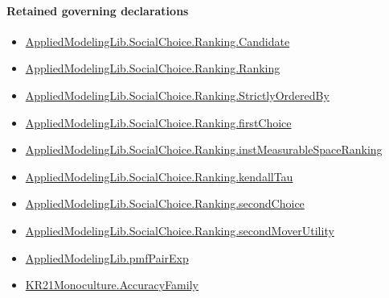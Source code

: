 \documentclass[10pt]{article}
\begin{document}
\paragraph{Retained governing declarations}
\begin{itemize}\raggedright
\item \hyperlink{library-prerequisite-8c0e6c25845ae78a}{Applied\allowbreak{}Modeling\allowbreak{}Lib.\allowbreak{}Social\allowbreak{}Choice.\allowbreak{}Ranking.\allowbreak{}Candidate}
\item \hyperlink{library-prerequisite-5cde54446d1ae021}{Applied\allowbreak{}Modeling\allowbreak{}Lib.\allowbreak{}Social\allowbreak{}Choice.\allowbreak{}Ranking.\allowbreak{}Ranking}
\item \hyperlink{library-prerequisite-3585717d1635654a}{Applied\allowbreak{}Modeling\allowbreak{}Lib.\allowbreak{}Social\allowbreak{}Choice.\allowbreak{}Ranking.\allowbreak{}Strictly\allowbreak{}Ordered\allowbreak{}By}
\item \hyperlink{governing-declaration-08e457479ee6cf15}{Applied\allowbreak{}Modeling\allowbreak{}Lib.\allowbreak{}Social\allowbreak{}Choice.\allowbreak{}Ranking.\allowbreak{}first\allowbreak{}Choice}
\item \hyperlink{governing-declaration-30ca9c740ef703ec}{Applied\allowbreak{}Modeling\allowbreak{}Lib.\allowbreak{}Social\allowbreak{}Choice.\allowbreak{}Ranking.\allowbreak{}inst\allowbreak{}Measurable\allowbreak{}Space\allowbreak{}Ranking}
\item \hyperlink{governing-declaration-127efd44d176e2ba}{Applied\allowbreak{}Modeling\allowbreak{}Lib.\allowbreak{}Social\allowbreak{}Choice.\allowbreak{}Ranking.\allowbreak{}kendall\allowbreak{}Tau}
\item \hyperlink{governing-declaration-25ac37baf58f31e2}{Applied\allowbreak{}Modeling\allowbreak{}Lib.\allowbreak{}Social\allowbreak{}Choice.\allowbreak{}Ranking.\allowbreak{}second\allowbreak{}Choice}
\item \hyperlink{library-prerequisite-21bd2a45ab961ae4}{Applied\allowbreak{}Modeling\allowbreak{}Lib.\allowbreak{}Social\allowbreak{}Choice.\allowbreak{}Ranking.\allowbreak{}second\allowbreak{}Mover\allowbreak{}Utility}
\item \hyperlink{governing-declaration-09677001d465ec9d}{Applied\allowbreak{}Modeling\allowbreak{}Lib.\allowbreak{}pmf\allowbreak{}Pair\allowbreak{}Exp}
\item \hyperlink{paper-prerequisite-a1353b2b1b6f0303}{KR21\allowbreak{}Monoculture.\allowbreak{}Accuracy\allowbreak{}Family}

\end{itemize}
\end{document}
